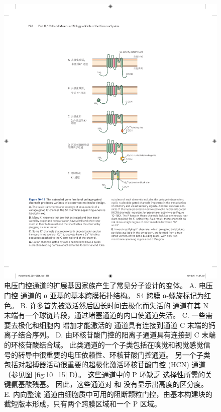 \begin{figure}[htbp]
	\centering
	\includegraphics[width=0.6\linewidth]{chap10/fig_10_12}
	\caption{电压门控通道的扩展基因家族产生了常见分子设计的变体。 A. 电压门控  通道的 α 亚基的基本跨膜拓扑结构。 S4 跨膜 α-螺旋标记为红色。 B. 许多首先被激活然后因长时间去极化而失活的  通道在其 N 末端有一个球链片段，通过堵塞通道的内口使通道失活。 C. 一些需要去极化和细胞内  增加才能激活的  通道具有连接到通道 C 末端的钙离子结合序列。 D. 由环核苷酸门控的阳离子通道具有连接到 C 末端的环核苷酸结合域。 此类通道的一个子类包括在嗅觉和视觉感觉信号的转导中很重要的电压依赖性、环核苷酸门控通道。 另一个子类包括对起搏器活动很重要的超极化激活环核苷酸门控 (HCN) 通道（参见图 \ref{fig:10_15} D）。 这些通道中的 P 环缺乏  选择性所需的关键氨基酸残基。 因此，这些通道对  和  没有显示出高度的区分度。 E. 内向整流  通道由细胞质中可用的阻断颗粒门控，由基本构建块的截短版本形成，只有两个跨膜区域和一个 P 区域。}
	\label{fig:10_12}
\end{figure}


